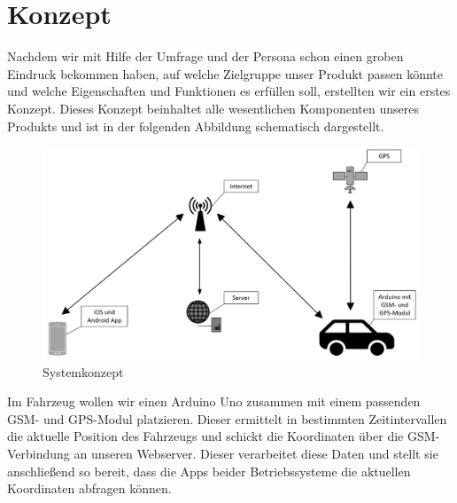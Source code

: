 \section{Konzept} 
Nachdem wir mit Hilfe der Umfrage und der Persona schon einen groben Eindruck bekommen haben, auf welche Zielgruppe unser Produkt passen könnte und welche Eigenschaften und Funktionen es erfüllen soll, erstellten wir ein erstes Konzept. Dieses Konzept beinhaltet alle wesentlichen Komponenten unseres Produkts und ist in der folgenden Abbildung schematisch dargestellt.
\begin{figure} [H]
	\begin{center}
		\includegraphics[width=1\textwidth]{Bilder/Konzept_Konzept.png}
		\caption{Systemkonzept}
		\label{konzept}
	\end{center}
\end{figure}
Im Fahrzeug wollen wir einen Arduino Uno zusammen mit einem passenden GSM- und GPS-Modul platzieren. Dieser ermittelt in bestimmten Zeitintervallen die aktuelle Position des Fahrzeugs und schickt die Koordinaten über die GSM-Verbindung an unseren Webserver. Dieser verarbeitet diese Daten und stellt sie anschließend so bereit, dass die Apps beider Betriebssysteme die aktuellen Koordinaten abfragen können.
